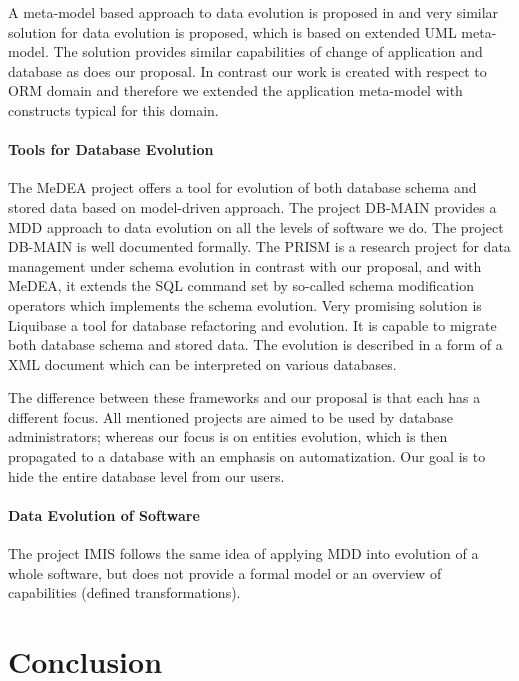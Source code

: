 \documentclass[runningheads]{comsis}
\begin{document}
A meta-model based approach to data evolution is proposed in \cite{Aboulsamh:MetaModelBasedApproachToIsDataEvolution} and very similar solution for data evolution is proposed, which is based on extended UML meta-model. The solution provides similar capabilities of change of application and database as does our proposal. In contrast our work is created with respect to ORM domain and therefore we extended the application meta-model with constructs typical for this domain.


\paragraph{Tools for Database Evolution} The MeDEA project \cite{Meda:Main} offers a tool for evolution of both database schema and stored data based on model-driven approach. The project DB-MAIN \cite{Hick:DBMAIN} provides a MDD approach to data evolution on all the levels of software we do. The project DB-MAIN is well documented formally. The PRISM is a research project for data management under schema evolution \cite{PRISM} in contrast with our proposal, and with MeDEA, it extends the SQL command set by so-called schema modification operators which implements the schema evolution.  Very promising solution is Liquibase \cite{Liquibase} a tool for database refactoring and evolution. It is capable to migrate both database schema and stored data. The evolution is described in a form of a XML document which can be interpreted on various databases. 

The difference between these frameworks and our proposal is that each has a different focus. All mentioned projects are aimed to  be used by database administrators; whereas our focus is on entities evolution, which is then propagated to a database with an emphasis on automatization. Our goal is to hide the entire database level from our users.

\paragraph{Data Evolution of Software} The project IMIS \cite{Bordbar:ModelBasedMigration} follows the same idea of applying MDD into evolution of a whole software, but does not provide a formal model or an overview of capabilities (defined transformations).






\section{Conclusion}

\end{document}
